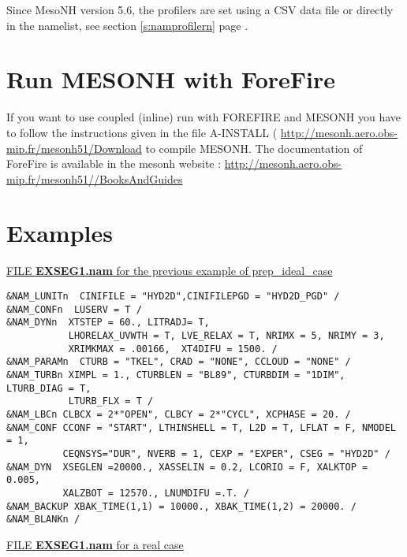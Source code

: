 Since MesoNH version 5.6, the profilers are set using a CSV data file or directly in the namelist, see section \ref{s:namprofilern} page \pageref{s:namprofilern}.

\newpage
\section{Run MESONH with ForeFire}
 If you want to use coupled (inline) run with FOREFIRE and MESONH you have to follow the instructions given in  the file A-INSTALL ( \url{http://mesonh.aero.obs-mip.fr/mesonh51/Download} to compile MESONH.
The documentation of ForeFire  is available in the mesonh website : \url{http://mesonh.aero.obs-mip.fr/mesonh51//BooksAndGuides}


\section{Examples }

\underline{FILE {\bf EXSEG1.nam} for the previous example of prep\_ideal\_case}

\begin{verbatim}
&NAM_LUNITn  CINIFILE = "HYD2D",CINIFILEPGD = "HYD2D_PGD" /
&NAM_CONFn  LUSERV = T /
&NAM_DYNn  XTSTEP = 60., LITRADJ= T,
           LHORELAX_UVWTH = T, LVE_RELAX = T, NRIMX = 5, NRIMY = 3, 
           XRIMKMAX = .00166,  XT4DIFU = 1500. /
&NAM_PARAMn  CTURB = "TKEL", CRAD = "NONE", CCLOUD = "NONE" /
&NAM_TURBn XIMPL = 1., CTURBLEN = "BL89", CTURBDIM = "1DIM", LTURB_DIAG = T,
           LTURB_FLX = T /
&NAM_LBCn CLBCX = 2*"OPEN", CLBCY = 2*"CYCL", XCPHASE = 20. /
&NAM_CONF CCONF = "START", LTHINSHELL = T, L2D = T, LFLAT = F, NMODEL = 1, 
          CEQNSYS="DUR", NVERB = 1, CEXP = "EXPER", CSEG = "HYD2D" /
&NAM_DYN  XSEGLEN =20000., XASSELIN = 0.2, LCORIO = F, XALKTOP = 0.005,
          XALZBOT = 12570., LNUMDIFU =.T. /
&NAM_BACKUP XBAK_TIME(1,1) = 10000., XBAK_TIME(1,2) = 20000. /
&NAM_BLANKn /
\end{verbatim}
\newpage
\underline{FILE {\bf EXSEG1.nam} for a real case}

